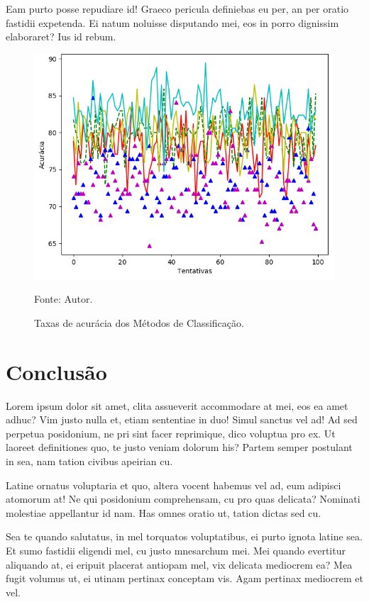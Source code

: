 \documentclass[
	12pt,				%
	openright,			%
	oneside,			%
	a4paper,			%
	english,			%
	french,				%
	spanish,			%
	brazil,				%
	]{abntex2}
\begin{document}
Eam purto posse repudiare id! Graeco pericula definiebas eu per, an per oratio fastidii expetenda. Ei natum noluisse disputando mei, eos in porro dignissim elaboraret? Ius id rebum.
\begin{figure}[ht]
    \centering
    \caption{Taxas de acurácia dos Métodos de Classificação.}
    \includegraphics[width=5.0in]{Images/acc-classification.png}
    \label{fig: grafico-acc}
    
    \centering \small Fonte: Autor.
\end{figure}

 \chapter{Conclusão}
 \label{ch: conclusao}
 
Lorem ipsum dolor sit amet, clita assueverit accommodare at mei, eos ea amet adhuc? Vim justo nulla et, etiam sententiae in duo! Simul sanctus vel ad! Ad sed perpetua posidonium, ne pri sint facer reprimique, dico voluptua pro ex. Ut laoreet definitiones quo, te justo veniam dolorum his? Partem semper postulant in sea, nam tation civibus apeirian cu.

Latine ornatus voluptaria et quo, altera vocent habemus vel ad, eum adipisci atomorum at! Ne qui posidonium comprehensam, cu pro quas delicata? Nominati molestiae appellantur id nam. Has omnes oratio ut, tation dictas sed cu.

Sea te quando salutatus, in mel torquatos voluptatibus, ei purto ignota latine sea. Et sumo fastidii eligendi mel, cu justo mnesarchum mei. Mei quando evertitur aliquando at, ei eripuit placerat antiopam mel, vix delicata mediocrem ea? Mea fugit volumus ut, ei utinam pertinax conceptam vis. Agam pertinax mediocrem et vel.
\end{document}
